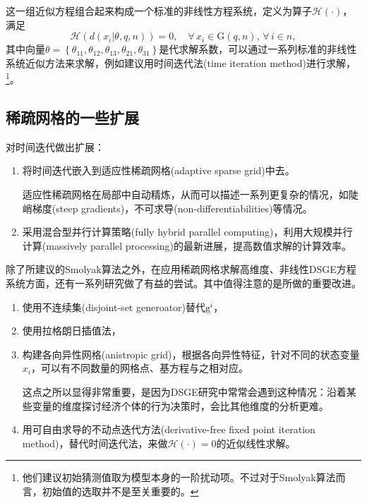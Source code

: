 这一组近似方程组合起来构成一个标准的非线性方程系统，定义为算子$\mathcal{H} (\cdot)$，满足
\begin{equation}
  \label{eq:pj-sparsity-estimation-h}
  \mathcal{H}
  \left(
  d \left( x_{i} | \theta, q, n \right)
  \right) =0, \quad \forall \, x_{i} \in \mathrm{G}(q,n), \, \forall \, i \in n,
\end{equation}
其中向量$\theta=\left\{ \theta_{11}, \theta_{12}, \theta_{13}, \theta_{21}, \theta_{31} \right\}$是代求解系数，可以通过一系列标准的非线性系统近似方法来求解，例如\cite{Krueger:2004gh, Malin:2011hf}建议用时间迭代法(time iteration method)进行求解，\footnote{他们建议初始猜测值取为模型本身的一阶扰动项。不过对于Smolyak算法而言，初始值的选取并不是至关重要的。}。

\subsection{稀疏网格的一些扩展}
\label{sec:pj-sparsity-extension}

\cite{Brumm:2017bn}对时间迭代做出扩展：
\begin{enumerate}
  \item 将时间迭代嵌入到适应性稀疏网格(adaptive sparse grid)中去。

  适应性稀疏网格在局部中自动精炼，从而可以描述一系列更复杂的情况，如陡峭梯度(steep gradients)，不可求导(non-differentiabilities)等情况。

  \item 采用混合型并行计算策略(fully hybrid parallel computing)，利用大规模并行计算(massively parallel processing)的最新进展，提高数值求解的计算效率。
\end{enumerate}


除了\cite{Krueger:2004gh, Malin:2011hf}所建议的Smolyak算法之外，在应用稀疏网格求解高维度、非线性DSGE方程系统方面，还有一系列研究做了有益的尝试。其中值得注意的是\cite{Judd:2014ce}所做的重要改进。
\begin{enumerate}
  \item 使用不连续集(disjoint-set generoator)替代$\mathrm{g}^{i}$，
  \item 使用拉格朗日插值法，
  \item 构建各向异性网格(anistropic grid)，根据各向异性特征，针对不同的状态变量$x_{i}$，可以有不同数量的网格点、基方程与之相对应。

  这点之所以显得非常重要，是因为DSGE研究中常常会遇到这种情况：沿着某些变量的维度探讨经济个体的行为决策时，会比其他维度的分析更难。

  \item \cite{Judd:2014ce}用可自由求导的不动点迭代方法(derivative-free fixed point iteration method)，替代\cite{Krueger:2004gh, Malin:2011hf}时间迭代法，来做$\mathcal{H}(\cdot)=0$的近似线性求解。
\end{enumerate}
